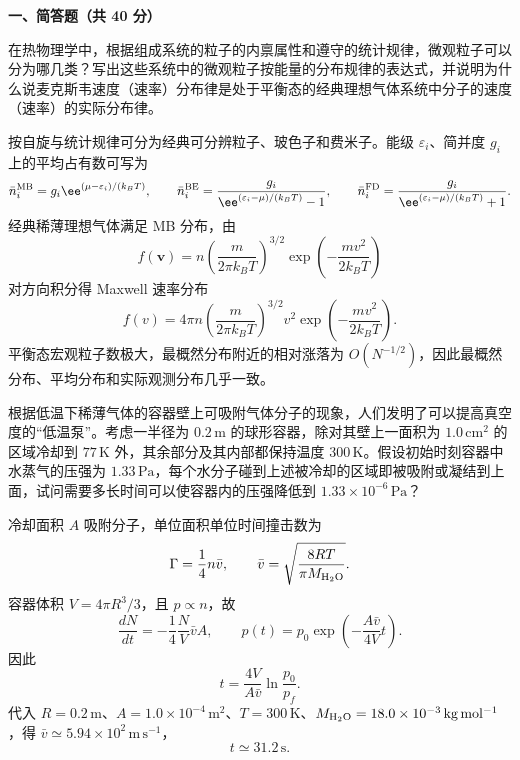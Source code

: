 ﻿

\textbf{一、简答题（共 40 分）}

\begin{question}
在热物理学中，根据组成系统的粒子的内禀属性和遵守的统计规律，微观粒子可以分为哪几类？写出这些系统中的微观粒子按能量的分布规律的表达式，并说明为什么说麦克斯韦速度（速率）分布律是处于平衡态的经典理想气体系统中分子的速度（速率）的实际分布律。
\begin{solution}
按自旋与统计规律可分为经典可分辨粒子、玻色子和费米子。能级 $\varepsilon_i$、简并度 $g_i$ 上的平均占有数可写为
\[
\bar n_i^{\rm MB}=g_i \ee^{(\mu-\varepsilon_i)/(k_BT)},\qquad
\bar n_i^{\rm BE}=\frac{g_i}{\ee^{(\varepsilon_i-\mu)/(k_BT)}-1},\qquad
\bar n_i^{\rm FD}=\frac{g_i}{\ee^{(\varepsilon_i-\mu)/(k_BT)}+1}.
\]
经典稀薄理想气体满足 MB 分布，由
\[
f(\mathbf v)=n\left(\frac{m}{2\pi k_BT}\right)^{3/2}
\exp\!\left(-\frac{mv^2}{2k_BT}\right)
\]
对方向积分得 Maxwell 速率分布
\[
f(v)=4\pi n\left(\frac{m}{2\pi k_BT}\right)^{3/2}v^2
\exp\!\left(-\frac{mv^2}{2k_BT}\right).
\]
平衡态宏观粒子数极大，最概然分布附近的相对涨落为 $O(N^{-1/2})$，因此最概然分布、平均分布和实际观测分布几乎一致。
\end{solution}
\end{question}

\begin{question}
根据低温下稀薄气体的容器壁上可吸附气体分子的现象，人们发明了可以提高真空度的“低温泵”。考虑一半径为 $0.2\,\mathrm m$ 的球形容器，除对其壁上一面积为 $1.0\,\mathrm{cm^2}$ 的区域冷却到 $77\,\mathrm K$ 外，其余部分及其内部都保持温度 $300\,\mathrm K$。假设初始时刻容器中水蒸气的压强为 $1.33\,\mathrm{Pa}$，每个水分子碰到上述被冷却的区域即被吸附或凝结到上面，试问需要多长时间可以使容器内的压强降低到 $1.33\times10^{-6}\,\mathrm{Pa}$？
\begin{solution}
冷却面积 $A$ 吸附分子，单位面积单位时间撞击数为
\[
\Gamma=\frac14 n\bar v,
\qquad \bar v=\sqrt{\frac{8RT}{\pi M_{\rm H_2O}}}.
\]
容器体积 $V=4\pi R^3/3$，且 $p\propto n$，故
\[
\frac{dN}{dt}=-\frac14\frac{N}{V}\bar v A,
\qquad
p(t)=p_0\exp\!\left(-\frac{A\bar v}{4V}t\right).
\]
因此
\[
t=\frac{4V}{A\bar v}\ln\frac{p_0}{p_f}.
\]
代入 $R=0.2\,\mathrm m$、$A=1.0\times10^{-4}\,\mathrm{m^2}$、$T=300\,\mathrm K$、$M_{\rm H_2O}=18.0\times10^{-3}\,\mathrm{kg\,mol^{-1}}$，得 $\bar v\simeq5.94\times10^2\,\mathrm{m\,s^{-1}}$，
\[
t\simeq 31.2\,\mathrm s.
\]
\end{solution}
\end{question}

